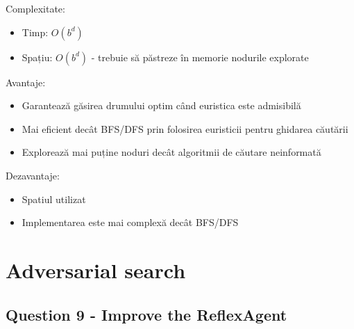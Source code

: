 \par Complexitate:
\begin {itemize}
	\item Timp: $O(b^d)$ 
	\item Spațiu: $O(b^d)$ - trebuie să păstreze în memorie nodurile explorate
\end {itemize}

\par Avantaje:
\begin {itemize}
	\item Garantează găsirea drumului optim când euristica este admisibilă
	\item Mai eficient decât BFS/DFS prin folosirea euristicii pentru ghidarea căutării
	\item Explorează mai puține noduri decât algoritmii de căutare neinformată
\end {itemize}

\par Dezavantaje:
\begin {itemize}
	\item Spatiul utilizat
	\item Implementarea este mai complexă decât BFS/DFS
\end {itemize}

\pagebreak

\section{Adversarial search}
\subsection{Question 9 - Improve the ReflexAgent} 

